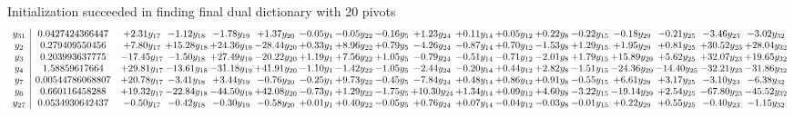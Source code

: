 \documentclass[9pt]{article}
\begin{document}
Initialization succeeded in finding final dual dictionary with 20 pivots
\[\begin{array}{c| c c@{\hskip 2pt} c@{\hskip 2pt} c@{\hskip 2pt} c@{\hskip 2pt} c@{\hskip 2pt} c@{\hskip 2pt} c@{\hskip 2pt} c@{\hskip 2pt} c@{\hskip 2pt} c@{\hskip 2pt} c@{\hskip 2pt} c@{\hskip 2pt} c@{\hskip 2pt} c@{\hskip 2pt} c@{\hskip 2pt} c@{\hskip 2pt} }
 y_{31}   &  0.0427424366447 & +  2.31 y_{17} & -1.12 y_{18} & -1.78 y_{19} & +  1.37 y_{20} & -0.05 y_{1} & -0.05 y_{22} & -0.16 y_{5} & +  1.23 y_{24} & +  0.11 y_{14} & +  0.05 y_{12} & +  0.22 y_{8} & -0.22 y_{15} & -0.18 y_{29} & -0.21 y_{25} & -3.46 y_{23} & -3.02 y_{32}\\
 y_{2}   &  0.279409550456 & +  7.80 y_{17} & + 15.28 y_{18} & + 24.36 y_{19} & -28.44 y_{20} & +  0.33 y_{1} & +  8.96 y_{22} & +  0.79 y_{5} & -4.26 y_{24} & -0.87 y_{14} & +  0.70 y_{12} & -1.53 y_{8} & +  1.29 y_{15} & +  1.95 y_{29} & +  0.81 y_{25} & + 30.52 y_{23} & + 28.04 y_{32}\\
 y_{3}   &  0.203993637775 & -17.45 y_{17} & -1.50 y_{18} & + 27.49 y_{19} & -20.22 y_{20} & +  1.19 y_{1} & +  7.56 y_{22} & +  1.05 y_{5} & -0.79 y_{24} & -0.51 y_{14} & -0.71 y_{12} & -2.01 y_{8} & +  1.79 y_{15} & + 15.89 y_{29} & +  5.62 y_{25} & + 32.07 y_{23} & + 19.65 y_{32}\\
 y_{4}   &  1.58859617664 & + 29.81 y_{17} & -13.61 y_{18} & -31.18 y_{19} & + 41.91 y_{20} & -1.10 y_{1} & -1.42 y_{22} & -1.05 y_{5} & -2.44 y_{24} & -0.20 y_{14} & +  0.44 y_{12} & +  2.82 y_{8} & -1.51 y_{15} & -24.36 y_{29} & -14.40 y_{25} & -32.21 y_{23} & -31.86 y_{32}\\
 y_{7}   &  0.00544786068807 & + 20.78 y_{17} & -3.41 y_{18} & +  3.44 y_{19} & -0.76 y_{20} & -0.25 y_{1} & +  9.73 y_{22} & -0.45 y_{5} & -7.84 y_{24} & +  0.48 y_{14} & +  0.86 y_{12} & +  0.91 y_{8} & -0.55 y_{15} & +  6.61 y_{29} & +  3.17 y_{25} & -3.10 y_{23} & -6.38 y_{32}\\
 y_{6}   &  0.660116458288 & + 19.32 y_{17} & -22.84 y_{18} & -44.50 y_{19} & + 42.08 y_{20} & -0.73 y_{1} & +  1.29 y_{22} & -1.75 y_{5} & + 10.30 y_{24} & +  1.34 y_{14} & +  0.09 y_{12} & +  4.60 y_{8} & -3.22 y_{15} & -19.14 y_{29} & +  2.54 y_{25} & -67.80 y_{23} & -45.52 y_{32}\\
 y_{27}   &  0.0534930642437 & -0.50 y_{17} & -0.42 y_{18} & -0.30 y_{19} & -0.58 y_{20} & +  0.01 y_{1} & +  0.40 y_{22} & -0.05 y_{5} & +  0.76 y_{24} & +  0.07 y_{14} & -0.04 y_{12} & -0.03 y_{8} & -0.01 y_{15} & +  0.22 y_{29} & +  0.55 y_{25} & -0.40 y_{23} & -1.15 y_{32}\\

\end{array}\]
\end{document}
